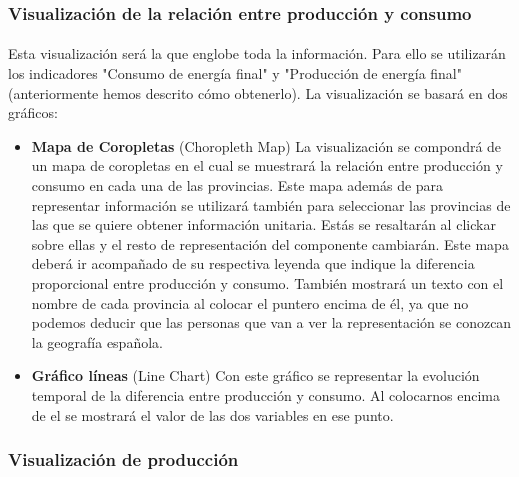 \documentclass[11pt,spanish]{article}
\begin{document}
			\subsubsection{Visualización de la relación entre producción y consumo}

				\paragraph{}
				Esta visualización será la que englobe toda la información. Para ello se utilizarán los indicadores "Consumo de energía final" y "Producción de energía final" (anteriormente hemos descrito cómo obtenerlo). La visualización se basará en dos gráficos:
				
				\begin{itemize}
				
					\item  {\bf Mapa de Coropletas} (Choropleth Map) La visualización se compondrá de un mapa de coropletas en el cual se muestrará la relación entre producción y consumo en cada una de las provincias. Este mapa además de para representar información se utilizará también para seleccionar las provincias de las que se quiere obtener información unitaria. Estás se resaltarán al clickar sobre ellas y el resto de representación del componente cambiarán. Este mapa deberá ir acompañado de su respectiva leyenda que indique la diferencia proporcional entre producción y consumo. También mostrará un texto con el nombre de cada provincia al colocar el puntero encima de él, ya que no podemos deducir que las personas que van a ver la representación se conozcan la geografía española.
					
					\item  {\bf Gráfico líneas} (Line Chart) Con este gráfico se representar la evolución temporal de la  diferencia entre producción y consumo. Al colocarnos encima de el se mostrará el valor de las dos variables en ese punto.
					
				\end{itemize}

			\subsubsection{Visualización de producción}
\end{document}
